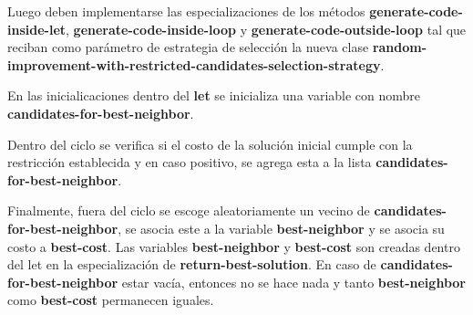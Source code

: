 Luego deben implementarse las especializaciones de los métodos \textbf{generate-code-inside-let}, \textbf{generate-code-inside-loop} y \textbf{generate-code-outside-loop} tal que reciban como parámetro de estrategia de selección la nueva clase \textbf{random-improvement-with-restricted-candidates-selection-strategy}.

En las inicialicaciones dentro del \textbf{let} se inicializa una variable con nombre \textbf{candidates-for-best-neighbor}.

Dentro del ciclo se verifica si el costo de la solución inicial cumple con la restricción establecida y en caso positivo, se agrega esta a la lista \textbf{candidates-for-best-neighbor}.

Finalmente, fuera del ciclo se escoge aleatoriamente un vecino de \textbf{candidates-for-best-neighbor}, se asocia este a la variable \textbf{best-neighbor} y se asocia su costo a \textbf{best-cost}. Las variables \textbf{best-neighbor} y \textbf{best-cost} son creadas dentro del let en la especialización de \textbf{return-best-solution}. En caso de \textbf{candidates-for-best-neighbor} estar vacía, entonces no se hace nada y tanto \textbf{best-neighbor} como \textbf{best-cost} permanecen iguales.





